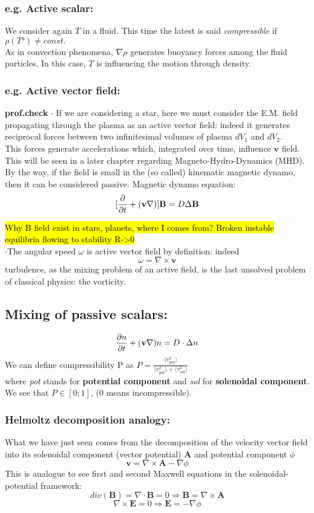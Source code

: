\documentclass[a4paper,11pt]{article}
\newcommand{\RA}{\Rightarrow}
\newcommand{\dive}{\nabla \cdot}
\newcommand{\cic}[1]{\mathbf{#1}}
\newcommand{\avg}[1]{\langle #1 \rangle}
\begin{document}
	\subsubsection{e.g. Active scalar:}
We consider again $T$ in a fluid. This time the latest is said \emph{compressible} if 
$ \rho(T°) \neq const. $\\
As in convection phenomena, $\nabla\rho$ generates buoyancy forces among the fluid particles. In this case, $T$ is influencing the motion through density.
	\subsubsection{e.g. Active vector field:} \textbf{prof.check}
$\cdot$ If we are considering a star, here we must consider the E.M. field propagating through the plasma as an active vector field: 
indeed it generates reciprocal forces between two infinitesimal volumes of plasma $dV_1$ and $dV_2$. \\
This forces generate accelerations which, integrated over time, influence $\cic{v}$ field.
This will be seen in a later chapter regarding Magneto-Hydro-Dynamics (MHD).
By the way, if the field is small in the (so called) kinematic magnetic dynamo, then it can be considered passive. 
Magnetic dynamo equation: \[ [\pdv{}{t}+(\cic{v}\nabla)] \cic{B}=D \Delta \cic{B} \]

\hl{Why B field exist in stars, planets, where I comes from? Broken instable equilibria flowing to stability R->0}\\

$\cdot$The angular speed $\omega$ is active vector field by definition: indeed
\[  \omega=\nabla \times \cic{v} \]
turbulence, as the mixing problem of an active field, is the last unsolved problem of classical physics: the vorticity.

\subsection{Mixing of passive scalars:}
\[ \pdv{n}{t}+(\cic{v} \nabla)n = D \cdot \Delta n \]
We can define compressibility P as $P=\frac{\avg{ v_{pot}^2}}{\avg{ v_{pot}^2}+\avg{ v_{sol}^2}}$\\
where \emph{pot} stands for \textbf{potential component} and \emph{sol} for \textbf{solenoidal component}. We see that $P \in [0;1]$, (0 means incompressible).

\subsubsection{Helmoltz decomposition analogy:}
What we have just seen comes from the decomposition of the velocity vector field into its solenoidal component (vector potential) \textbf{A} and potential component $\phi$
\[  \cic{v}=\nabla \times \cic{A}-\nabla\phi \]
This is analogue to see first and second Maxwell equations in the solenoidal-potential framework:
\[  div(\cic{B})=\dive \cic{B}=0 \RA \cic{B}=\nabla\times \cic{A} \]
\[  \nabla \times \cic{E}=0 \RA \cic{E}=-\nabla\phi  \]
\end{document}
